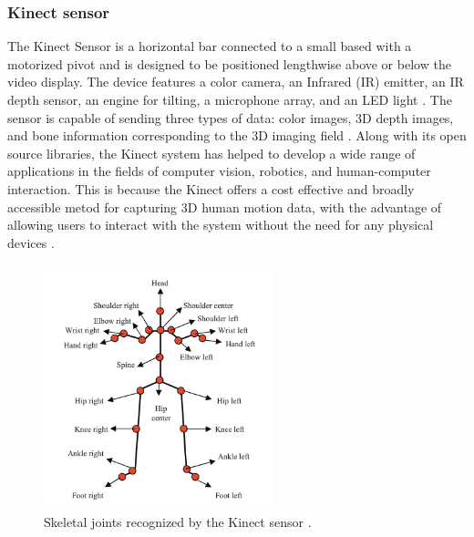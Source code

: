                     \subsubsection{Kinect sensor} 

                        The Kinect Sensor is a horizontal bar connected to a small based with a motorized pivot and is designed to be positioned lengthwise above or below the video display. The device features a color camera, an Infrared (IR) emitter, an IR depth sensor, an engine for tilting, a microphone array, and an LED light \cite{abbasi_motion_2021}. The sensor is capable of sending three types of data: color images, 3D depth images, and bone information corresponding to the 3D imaging field \cite{zheng_cg-recognizer_2022}\cite{acis_classification_2023}. Along with its open source libraries, the Kinect system has helped to develop a wide range of applications in the fields of computer vision, robotics, and human-computer interaction. This is because the Kinect offers a cost effective and broadly accessible metod for capturing 3D human motion data, with the advantage of allowing users to interact with the system without the need for any physical devices \cite{gowing_kinect_2014}.
                
                        \begin{figure}[H]
                            \centering
                            \includegraphics[width=0.6\textwidth]{./resources/kinect/joints.png}
                            \caption{Skeletal joints recognized by the Kinect sensor \cite{jais_review_2015}.}
                            \label{fig:kinect_sensor_v2}
                        \end{figure}

